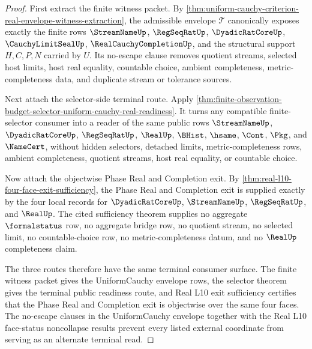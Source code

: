 \begin{proof}
First extract the finite witness packet. By \autoref{thm:uniform-cauchy-criterion-real-envelope-witness-extraction}, the admissible envelope $\mathcal{T}$ canonically exposes exactly the finite rows $\StreamNameUp$, $\RegSeqRatUp$, $\DyadicRatCoreUp$, $\CauchyLimitSealUp$, $\RealCauchyCompletionUp$, and the structural support $H,C,P,N$ carried by $U$. Its no-escape clause removes quotient streams, selected host limits, host real equality, countable choice, ambient completeness, metric-completeness data, and duplicate stream or tolerance sources.

Next attach the selector-side terminal route. Apply \autoref{thm:finite-observation-budget-selector-uniform-cauchy-real-readiness}. It turns any compatible finite-selector consumer into a reader of the same public rows $\StreamNameUp$, $\DyadicRatCoreUp$, $\RegSeqRatUp$, $\RealUp$, $\BHist$, $\hsame$, $\Cont$, $\Pkg$, and $\NameCert$, without hidden selectors, detached limits, metric-completeness rows, ambient completeness, quotient streams, host real equality, or countable choice.

Now attach the objectwise Phase Real and Completion exit. By \autoref{thm:real-l10-four-face-exit-sufficiency}, the Phase Real and Completion exit is supplied exactly by the four local records for $\DyadicRatCoreUp$, $\StreamNameUp$, $\RegSeqRatUp$, and $\RealUp$. The cited sufficiency theorem supplies no aggregate $\formalstatus$ row, no aggregate bridge row, no quotient stream, no selected limit, no countable-choice row, no metric-completeness datum, and no $\RealUp$ completeness claim.

The three routes therefore have the same terminal consumer surface. The finite witness packet gives the UniformCauchy envelope rows, the selector theorem gives the terminal public readiness route, and Real L10 exit sufficiency certifies that the Phase Real and Completion exit is objectwise over the same four faces. The no-escape clauses in the UniformCauchy envelope together with the Real L10 face-status noncollapse results prevent every listed external coordinate from serving as an alternate terminal read.
\end{proof}
